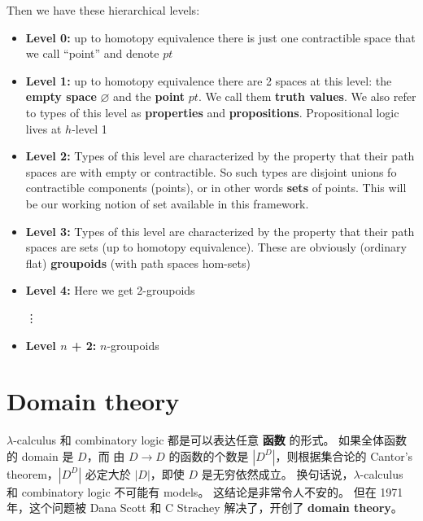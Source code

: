 \documentclass[12pt, orivec]{article}
\newcommand{\cc}[2]{#1}
\newcommand{\cc}[2]{#2}
\newcommand{\tab}{\hspace*{2cm}}
\begin{document}
Then we have these hierarchical levels:

\begin{itemize}
\item \textbf{Level 0:} up to homotopy equivalence there is just one contractible space that we call ``point'' and denote $pt$

\item \textbf{Level 1:} up to homotopy equivalence there are 2 spaces at this level:  the \textbf{empty space} $\varnothing$ and the \textbf{point} $pt$.  We call them \textbf{truth values}.  We also refer to types of this level as \textbf{properties} and \textbf{propositions}.  Propositional logic lives at $h$-level 1

\item \textbf{Level 2:}  Types of this level are characterized by the property that their path spaces are with empty or contractible.  So such types are disjoint unions fo contractible components (points), or in other words \textbf{sets} of points.  This will be our working notion of set available in this framework.

\item \textbf{Level 3:}  Types of this level are characterized by the property that their path spaces are sets (up to homotopy equivalence).  These are obviously (ordinary flat) \textbf{groupoids} (with path spaces hom-sets)

\item \textbf{Level 4:}  Here we get 2-groupoids

\tab \vdots
\item \textbf{Level $n$ + 2:}  $n$-groupoids
\end{itemize}

\section{Domain theory}

\cc{$\lambda$-calculus 和 combinatory logic 都是可以表达任意 \textbf{函数} 的形式。 如果全体函数的 domain 是 $D$，而 由 $D \rightarrow D$ 的函数的个数是 $|D^D|$，则根据集合论的 Cantor's theorem，$|D^D|$ 必定大於 $|D|$，即使 $D$ 是无穷依然成立。 换句话说，$\lambda$-calculus 和 combinatory logic 不可能有 models。  这结论是非常令人不安的。 但在 1971 年，这个问题被 Dana Scott 和 C Strachey 解决了，开创了 \textbf{domain theory}。
}{
Both $\lambda$-calculus and combinatory logic are formalisms for expressing arbitrary \textbf{functions}.  If the domain of the whole function is $D$ and the number of functions by $D \rightarrow D$ is $|D^D|$, $|D^D|$ must be greater than $|D|$ according to Cantor's theorem, even if $D$ is infinite.  In other words, $\lambda$-calculus and combinatory logic are unlikely to have models. This conclusion is very disturbing. But in 1971, the problem was solved by Dana Scott and C Strachey, creating \textbf{domain theory}.}
\end{document}
